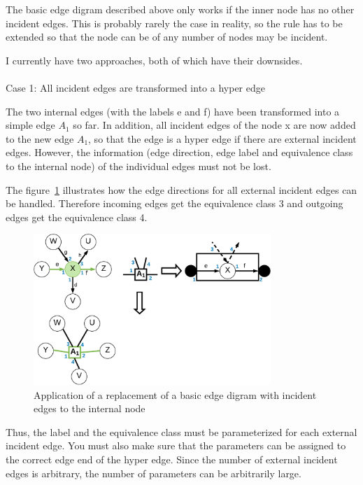 \documentclass[a4paper]{scrartcl}
\begin{document}
The basic edge digram described above only works if the inner node has no other incident edges. This is probably rarely the case in reality, so the rule has to be extended so that the node can be of any number of nodes may be incident.

I currently have two approaches, both of which have their downsides.
\\\\
Case 1: All incident edges are transformed into a hyper edge

The two internal edges (with the labels e and f) have been transformed into a simple edge $A_1$ so far. In addition, all incident edges of the node x are now added to the new edge $A_1$, so that the edge is a hyper edge if there are external incident edges. However, the information (edge direction, edge label and equivalence class to the internal node) of the individual edges must not be lost. 

The figure~\ref{fig:incedentEdges1} illustrates how the edge directions for all external incident edges can be handled. Therefore incoming edges get the equivalence class 3 and outgoing edges get the equivalence class 4. 

\begin{figure}[h]
	\centering
	\includegraphics[width=0.8\textwidth]{img/edgeDigram_params}
	\caption{Application of a replacement of a basic edge digram with incident edges to the internal node}
	\label{fig:incedentEdges1}
\end{figure}

Thus, the label and the equivalence class must be parameterized for each external incident edge. You must also make sure that the parameters can be assigned to the correct edge end of the hyper edge. Since the number of external incident edges is arbitrary, the number of parameters can be arbitrarily large. 
\end{document}
